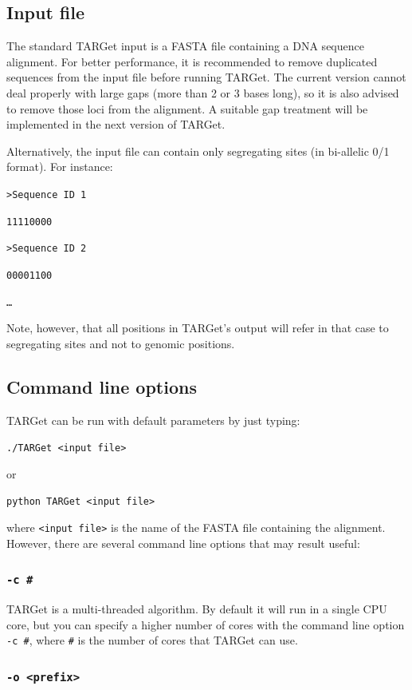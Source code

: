 \documentclass[12pt]{article}
\begin{document}
\subsection*{Input file}

The standard TARGet input is a FASTA file containing a DNA sequence alignment. For better performance, it is recommended to remove duplicated sequences from the input file before running TARGet. The current version cannot deal properly with large gaps (more than 2 or 3 bases long), so it is also advised to remove those loci from the alignment. A suitable gap treatment will be implemented in the next version of TARGet.

Alternatively, the input file can contain only segregating sites (in bi-allelic 0/1 format). For instance:

\texttt{>Sequence ID 1}

\texttt{11110000}

\texttt{>Sequence ID 2}

\texttt{00001100}

\texttt{\ldots}

\noindent Note, however, that all positions in TARGet's output will refer in that case to segregating sites and not to genomic positions.

\subsection*{Command line options}

TARGet can be run with default parameters by just typing:

\texttt{./TARGet <input file>}

\noindent or

\texttt{python TARGet <input file>}

\noindent where \texttt{<input file>} is the name of the FASTA file containing the alignment. However, there are several command line options that may result useful:

\subsubsection*{\texttt{-c \#}}

TARGet is a multi-threaded algorithm. By default it will run in a single CPU core, but you can specify a higher number of cores with the command line option \texttt{-c \#}, where \texttt{\#} is the number of cores that TARGet can use.

\subsubsection*{\texttt{-o <prefix>}}
\end{document}
